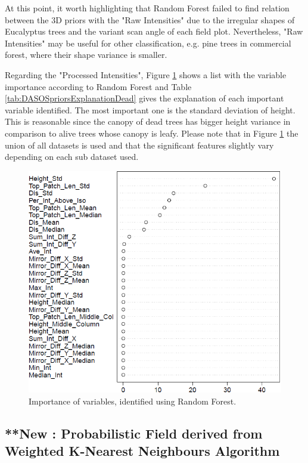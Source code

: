 \documentclass{subfiles}
\begin{document}
	
	\par At this point, it worth highlighting that Random Forest failed to find relation between the 3D priors with the "Raw Intensities" due to the irregular shapes of Eucalyptus trees and the variant scan angle of each field plot. Nevertheless, "Raw Intensities" may be useful for other classification, e.g. pine trees in commercial forest, where their shape variance is smaller.
	
	\par Regarding the "Processed Intensities", Figure \ref{fig:c0_RandomForest} shows a list with the variable importance according to Random Forest and Table \ref{tab:DASOSpriorsExplanationDead} gives the explanation of each important variable identified. The most important one is the standard deviation of height. This is reasonable since the canopy of dead trees has bigger height variance in comparison to alive trees whose canopy is leafy. Please note that in Figure \ref{fig:c0_RandomForest} the union of all datasets is used and that the significant features slightly vary depending on each sub dataset used.  
	
		\begin{figure} [h!]			
				\centering
				\includegraphics[width=.67\textwidth]{img/dead/c0_random_forest}
				\caption{Importance of variables, identified using Random Forest.}
				\label{fig:c0_RandomForest}
		\end{figure}
		

	
	
	
\subsection{{\color{red} **New : }Probabilistic Field derived from Weighted K-Nearest Neighbours Algorithm }
\end{document}
